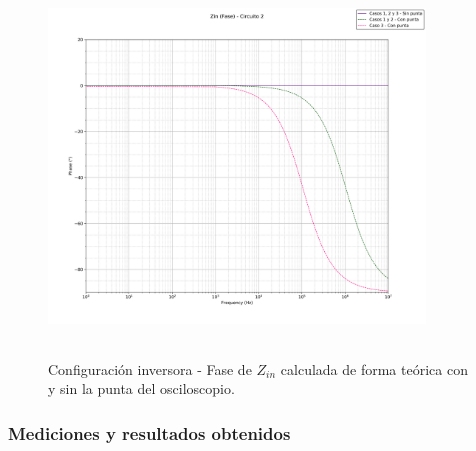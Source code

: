 \begin{figure}[H] %
	\centering
	\includegraphics[width=10cm,height=10cm,keepaspectratio]{../EJ1/00GRAFICOS/teoricos/circ2zinfase.png}
	\caption{Configuración inversora - Fase de $Z_{in}$ calculada de forma te\'orica con y sin la punta del osciloscopio.}
	\label{c2zintp}
\end{figure}

\subsubsection{Mediciones y resultados obtenidos} %

